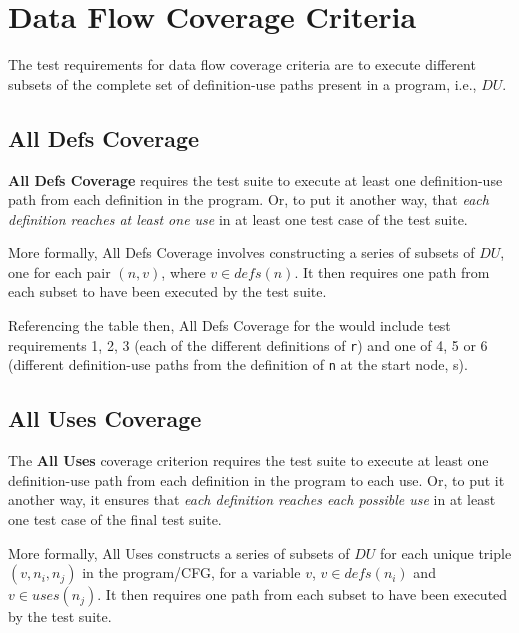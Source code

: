 
\section{Data Flow Coverage Criteria}

The test requirements for data flow coverage criteria are to execute different
subsets of the complete set of definition-use paths present in a program, i.e.,
$\mathit{DU}$.


\subsection{All Defs Coverage}

{\bf All Defs Coverage} requires the test suite to execute at least one
definition-use path from each definition in the program. Or, to put it another
way, that {\it each definition reaches at least one use} in at least one test
case of the test suite.

More formally, All Defs Coverage involves constructing a series of subsets of
$\mathit{DU}$, one for each pair $(n, v)$, where $v \in \mathit{defs}(n)$. It
then requires one path from each subset to have been executed by the test suite.


Referencing the table then, All Defs Coverage for the \signmethod would include
test requirements 1, 2, 3 (each of the different definitions of {\tt r}) and one
of 4, 5 or 6 (different definition-use paths from the definition of {\tt n} at
the start node, s).


\subsection{All Uses Coverage}

The {\bf All Uses} coverage criterion requires the test suite to execute at
least one definition-use path from each definition in the program to each use.
Or, to put it another way, it ensures that {\it each definition reaches each
possible use} in at least one test case of the final test suite. 

More formally, All Uses constructs a series of subsets of $DU$ for each unique
triple $(v, n_i, n_j)$ in the program/CFG, %
for a variable $v$, $v \in \mathit{defs}(n_i)$ and $v \in \mathit{uses}(n_j)$. It then
requires one path from each subset to have been executed by the test suite.

